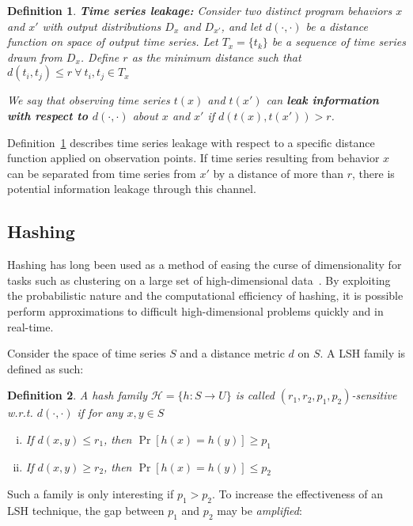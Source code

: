\documentclass[a4paper]{article}
\newtheorem{definition}{Definition}
\begin{document}
\begin{definition}\label{defn:leakage}
	\textbf{Time series leakage:} Consider two distinct program behaviors $x$ and $x'$ with output distributions $D_x$ and $D_{x'}$, and let $d(\cdot,\cdot)$ be a distance function on space of output time series.
    Let $T_x = \{t_k\}$ be a sequence of time series drawn from $D_x$.
    Define $r$ as the minimum distance such that $d(t_i, t_j) \le r~\forall~t_i,t_j \in T_x$

    We say that observing time series $t(x)$ and $t(x')$ can \textbf{leak information with respect to $d(\cdot,\cdot)$} about $x$ and $x'$ if $d(t(x),t(x')) > r$.
\end{definition}

Definition~\ref{defn:leakage} describes time series leakage with respect to a specific distance function applied on observation points.
If time series resulting from behavior $x$ can be separated from time series from $x'$ by a distance of more than $r$, there is potential information leakage through this channel.

\subsection{Hashing}
\label{subsec:hashing}
Hashing has long been used as a method of easing the curse of dimensionality for tasks such as clustering on a large set of high-dimensional data~\cite{Indyk98-ANN,Gionis99-SSH,Datar04-LSH}.
By exploiting the probabilistic nature and the computational efficiency of hashing, it is possible perform approximations to difficult high-dimensional problems quickly and in real-time.

Consider the space of time series $S$ and a distance metric $d$ on $S$.
A LSH family is defined as such:

\begin{definition}\label{def:hash_family}
    A hash family $\mathcal{H} = \{ h : S \rightarrow U \}$ is called $(r_1, r_2, p_1, p_2)$-sensitive w.r.t. $d(\cdot,\cdot)$ if for any $x,y \in S$
    \begin{enumerate}[(i)]
        \item\label{itm:hash_def1} If $d(x,y) \le r_1$, then $\Pr[h(x) = h(y)] \ge p_1$
        \item\label{itm:hash_def2} If $d(x,y) \ge r_2$, then $\Pr[h(x) = h(y)] \le p_2$
    \end{enumerate}
\end{definition}

Such a family is only interesting if $p_1 > p_2$.
To increase the effectiveness of an LSH technique, the gap between $p_1$ and $p_2$ may be \textit{amplified}:
\end{document}
